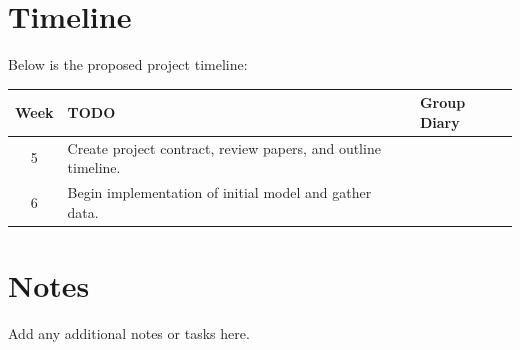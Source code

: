 \documentclass[12pt]{report}
\begin{document}
\section{Timeline}
Below is the proposed project timeline:
\vspace{1em}

\def\arraystretch{1.2} %
\noindent\begin{tabular}{|c|p{11cm}|p{4cm}|}
    \hline
    \textbf{Week} & \textbf{TODO} & \textbf{Group Diary} \\ \hline \hline
    5 & Create project contract, review papers, and outline timeline. & \\ \hline
    6 & Begin implementation of initial model and gather data. & \\ \hline
\end{tabular}

\section*{Notes}
Add any additional notes or tasks here.

 

\end{document}
